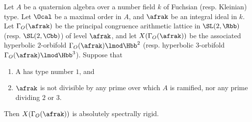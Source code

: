 


\begin{thm}
  Let $A$ be a quaternion algebra over a number field $k$ of Fuchsian (resp. Kleinian) type. Let $\Ocal$ be a maximal order in $A$, and $\afrak$ be an integral ideal in $k$.  Let $\Gamma_O(\afrak)$ be the principal congruence arithmetic lattice in $\SL(2,\Rbb)$ (resp. $\SL(2,\Cbb)$) of level $\afrak$, and let $X(\Gamma_O(\afrak))$ be the associated hyperbolic $2$-orbifold $\Gamma_O(\afrak) \lmod \Hbb^2$ (resp. hyperbolic $3$-orbifold $\Gamma_O(\afrak) \lmod \Hbb^3$). Suppose that
  \begin{enumerate}
    \item A has type number $1$, and
    \item $\afrak$ is not divisible by any prime over which  $A$ is ramified, nor any prime dividing $2$ or $3$.
  \end{enumerate}
  Then $X(\Gamma_O (\afrak))$ is absolutely spectrally rigid.
\end{thm}

